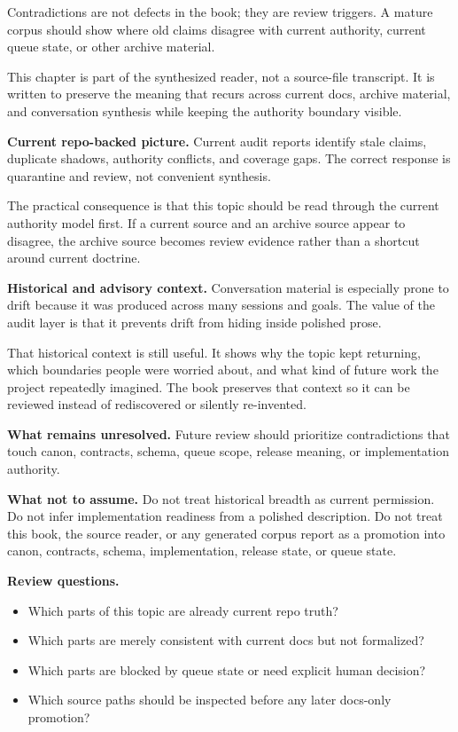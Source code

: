 \documentclass[10.5pt,a4paper,openany]{book}
\begin{document}
Contradictions are not defects in the book; they are review triggers.\allowbreak{} A mature corpus should show where old claims disagree with current authority, current queue state, or other archive material.\allowbreak{}


This chapter is part of the synthesized reader, not a source-\allowbreak{}file transcript.\allowbreak{} It is written to preserve the meaning that recurs across current docs, archive material, and conversation synthesis while keeping the authority boundary visible.\allowbreak{}


\textbf{Current repo-backed picture.} Current audit reports identify stale claims, duplicate shadows, authority conflicts, and coverage gaps.\allowbreak{} The correct response is quarantine and review, not convenient synthesis.\allowbreak{}


The practical consequence is that this topic should be read through the current authority model first.\allowbreak{} If a current source and an archive source appear to disagree, the archive source becomes review evidence rather than a shortcut around current doctrine.\allowbreak{}


\textbf{Historical and advisory context.} Conversation material is especially prone to drift because it was produced across many sessions and goals.\allowbreak{} The value of the audit layer is that it prevents drift from hiding inside polished prose.\allowbreak{}


That historical context is still useful.\allowbreak{} It shows why the topic kept returning, which boundaries people were worried about, and what kind of future work the project repeatedly imagined.\allowbreak{} The book preserves that context so it can be reviewed instead of rediscovered or silently re-\allowbreak{}invented.\allowbreak{}


\textbf{What remains unresolved.} Future review should prioritize contradictions that touch canon, contracts, schema, queue scope, release meaning, or implementation authority.\allowbreak{}


\textbf{What not to assume.} Do not treat historical breadth as current permission.\allowbreak{} Do not infer implementation readiness from a polished description.\allowbreak{} Do not treat this book, the source reader, or any generated corpus report as a promotion into canon, contracts, schema, implementation, release state, or queue state.\allowbreak{}


\textbf{Review questions.}


\begin{itemize}
\item Which parts of this topic are already current repo truth?
\item Which parts are merely consistent with current docs but not formalized?
\item Which parts are blocked by queue state or need explicit human decision?
\item Which source paths should be inspected before any later docs-\allowbreak{}only promotion?
\end{itemize}
\end{document}
